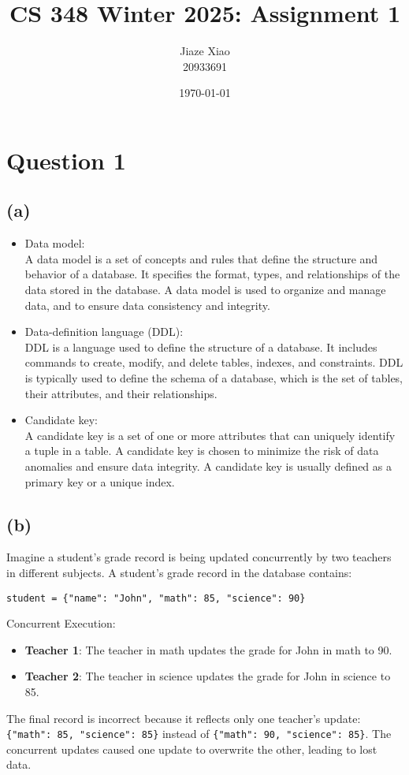 \documentclass{article}
\title{\textbf{CS 348 Winter 2025: Assignment 1}}
\author{Jiaze Xiao \\ 20933691}
\date{\today}
\begin{document}
\maketitle

\section*{Question 1}
\subsection*{(a)}
\begin{itemize}
    \item Data model:\\
          A data model is a set of concepts and rules that define the structure and behavior of a database. It specifies the format, types, and relationships of the data stored in the database. A data model is used to organize and manage data, and to ensure data consistency and integrity.
    \item Data-definition language (DDL):\\
          DDL is a language used to define the structure of a database. It includes commands to create, modify, and delete tables, indexes, and constraints. DDL is typically used to define the schema of a database, which is the set of tables, their attributes, and their relationships.
    \item Candidate key:\\
          A candidate key is a set of one or more attributes that can uniquely identify a tuple in a table. A candidate key is chosen to minimize the risk of data anomalies and ensure data integrity. A candidate key is usually defined as a primary key or a unique index.
\end{itemize}

\subsection*{(b)}
Imagine a student's grade record is being updated concurrently by two teachers in different subjects.
A student's grade record in the database contains:
\begin{center}
    \texttt{student = \{"name": "John", "math": 85, "science": 90\}}
\end{center}
Concurrent Execution:
\begin{itemize}
    \item \textbf{Teacher 1}: The teacher in math updates the grade for John in math to 90.
    \item \textbf{Teacher 2}: The teacher in science updates the grade for John in science to 85.
\end{itemize}
The final record is incorrect because it reflects only one teacher's update: \texttt{\{"math": 85, "science": 85\}} instead of \texttt{\{"math": 90, "science": 85\}}. The concurrent updates caused one update to overwrite the other, leading to lost data.
\end{document}
